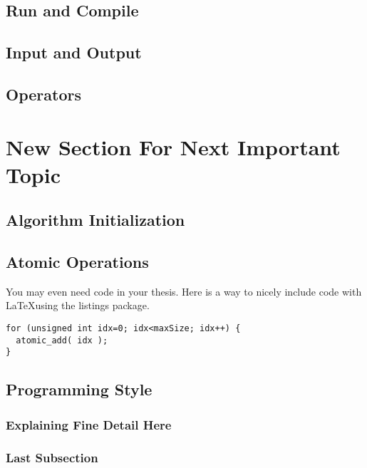
\subsection{Run and Compile} %

\subsection{Input and Output} %

\subsection{Operators} %

\section{New Section For Next Important Topic}

\subsection{Algorithm Initialization}
\subsection{Atomic Operations}

You may even need code in your thesis. Here is a way to nicely include code with \LaTeX using the listings package.
\begin{lstlisting}
for (unsigned int idx=0; idx<maxSize; idx++) {
  atomic_add( idx );
}
\end{lstlisting}

\subsection{Programming Style}
\subsubsection{Explaining Fine Detail Here}

\subsubsection{Last Subsection}
